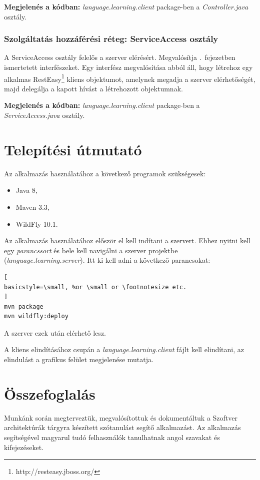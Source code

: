 \documentclass[11pt, a4paper]{article}
\begin{document}
     \textbf{Megjelenés a kódban:} \textit{language.learning.client} package-ben a \textit{Controller.java} osztály.
     
     \subsubsection{Szolgáltatás hozzáférési réteg: ServiceAccess osztály}
     
     A ServiceAccess osztály felelős a szerver elérésért. Megvalósítja .~fejezetben ismertetett interfészeket. Egy interfész megvalósítása abból áll, hogy létrehoz egy alkalmas RestEasy\footnote{http://resteasy.jboss.org/} kliens objektumot, amelynek megadja a szerver elérhetőségét, majd delegálja a kapott hívást a létrehozott objektumnak.
     
     \vspace{3mm}
     \textbf{Megjelenés a kódban:} \textit{language.learning.client} package-ben a \textit{ServiceAccess.java} osztály.
     
    \section{Telepítési útmutató}
    \label{sec:telepítés}
    Az alkalmazás használatához a következő programok szükségesek:
    \begin{itemize}
    	\item Java 8,
    	\item Maven 3.3,
    	\item WildFly 10.1.
    \end{itemize}

	Az alkalmazás használatához először el kell indítani a szervert. Ehhez nyitni kell egy \emph{parancssort} és bele kell navigálni a szerver projektbe (\textsl{language.learning.server}). Itt ki kell adni a következő parancsokat:
\begin{lstlisting}[
basicstyle=\small, %or \small or \footnotesize etc.
]
mvn package
mvn wildfly:deploy
\end{lstlisting}
	A szerver ezek után elérhető lesz.
	
	A kliens elindításához csupán a \textsl{language.learning.client} fájlt kell elindítani, az elindulást a grafikus felület megjelenése mutatja.
	
	\section{Összefoglalás}
	\label{sec:összefoglalás}
	Munkánk során megterveztük, megvalósítottuk és dokumentáltuk a Szoftver architektúrák tárgyra készített szótanulást segítő alkalmazást. Az alkalmazás segítségével magyarul tudó felhasználók tanulhatnak angol szavakat és kifejezéseket.
	
\end{document}
